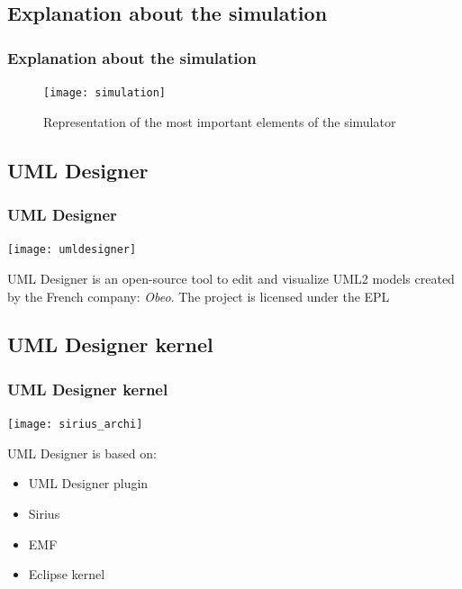\documentclass[10pt, svgnames, compress, red]{beamer}
\begin{document}
\subsection{Explanation about the simulation}
\begin{frame}
  \frametitle{Explanation about the simulation}
  \begin{figure}[h]
    \centering
    \texttt{[image: simulation]}
    \caption{Representation of the most important elements of the simulator}
  \end{figure}

  \transdissolve[duration=0.1]
\end{frame}


\subsection{UML Designer}
\begin{frame}
  \frametitle{UML Designer}
  \begin{minipage}{0.45\textwidth}
    \texttt{[image: umldesigner]}
  \end{minipage}\hfill
  \begin{minipage}{0.45\textwidth}
    UML Designer is an open-source tool to edit and visualize UML2 models created by the French company: \textit{Obeo}. The project is licensed under the EPL%
  \end{minipage}
  \transdissolve[duration=0.1]
\end{frame}

\subsection{UML Designer kernel}
\begin{frame}
  \frametitle{UML Designer kernel}
  \begin{minipage}{0.45\textwidth}
    \texttt{[image: sirius\_archi]}
  \end{minipage} \hfill
  \begin{minipage}{0.45\textwidth}
    UML Designer is based on:
    \begin{itemize}
    \item UML Designer plugin
    \item Sirius
    \item EMF
    \item Eclipse kernel
    \end{itemize}
  \end{minipage}

  \transdissolve[duration=0.1]
\end{frame}
\end{document}
